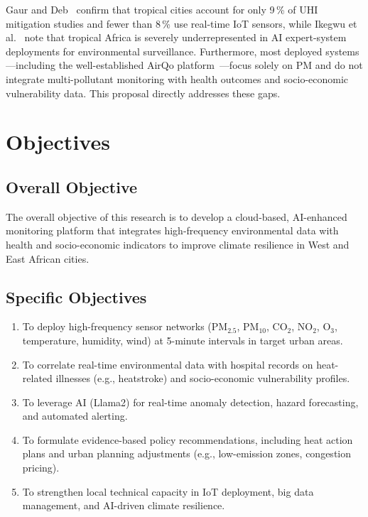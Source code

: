 Gaur and Deb~\cite{gaur2026} confirm that tropical cities account for only 9\,\% of UHI mitigation studies and fewer than 8\,\% use real-time IoT sensors, while Ikegwu et al.~\cite{ikegwu2026} note that tropical Africa is severely underrepresented in AI expert-system deployments for environmental surveillance. Furthermore, most deployed systems—including the well-established AirQo platform~\cite{bainomugisha2024}—focus solely on PM and do not integrate multi-pollutant monitoring with health outcomes and socio-economic vulnerability data. This proposal directly addresses these gaps.

\section{Objectives}
\subsection{Overall Objective}
The overall objective of this research is to develop a cloud-based, AI-enhanced monitoring platform that integrates high-frequency environmental data with health and socio-economic indicators to improve climate resilience in West and East African cities.

\subsection{Specific Objectives}
\begin{enumerate}[label=\roman*)]
  \item To deploy high-frequency sensor networks (PM$_{2.5}$, PM$_{10}$, CO$_2$, NO$_2$, O$_3$, temperature, humidity, wind) at 5-minute intervals in target urban areas.
  \item To correlate real-time environmental data with hospital records on heat-related illnesses (e.g., heatstroke) and socio-economic vulnerability profiles.
  \item To leverage AI (Llama2) for real-time anomaly detection, hazard forecasting, and automated alerting.
  \item To formulate evidence-based policy recommendations, including heat action plans and urban planning adjustments (e.g., low-emission zones, congestion pricing).
  \item To strengthen local technical capacity in IoT deployment, big data management, and AI-driven climate resilience.
\end{enumerate}

